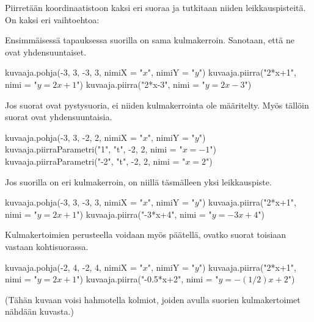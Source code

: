 
Piirretään koordinaatistoon kaksi eri suoraa ja tutkitaan niiden leikkauspisteitä.
On kaksi eri vaihtoehtoa:

Ensimmäisessä tapauksessa suorilla on sama kulmakerroin. Sanotaan, että ne ovat yhdensuuntaiset.

\begin{kuva}
    kuvaaja.pohja(-3, 3, -3, 3, nimiX = "$x$", nimiY = "$y$")
    kuvaaja.piirra("2*x+1", nimi = "$y=2x+1$")
    kuvaaja.piirra("2*x-3", nimi = "$y=2x-3$")
\end{kuva}

Jos suorat ovat pystysuoria, ei niiden kulmakerrointa ole määritelty. Myös tällöin suorat ovat yhdensuuntaisia.

\begin{kuva}
    kuvaaja.pohja(-3, 3, -2, 2, nimiX = "$x$", nimiY = "$y$")
    kuvaaja.piirraParametri("1", "t", -2, 2, nimi = "$x=-1$")
    kuvaaja.piirraParametri("-2", "t", -2, 2, nimi = "$x=2$")
\end{kuva}


Jos suorilla on eri kulmakerroin, on niillä täsmälleen yksi leikkauspiste. 

\begin{kuva}
    kuvaaja.pohja(-3, 3, -3, 3, nimiX = "$x$", nimiY = "$y$")
    kuvaaja.piirra("2*x+1", nimi = "$y=2x+1$")
    kuvaaja.piirra("-3*x+4", nimi = "$y=-3x+4$")
\end{kuva}

Kulmakertoimien perusteella voidaan myös päätellä, ovatko suorat toisiaan vastaan kohtisuorassa.

\begin{kuva}
    kuvaaja.pohja(-2, 4, -2, 4, nimiX = "$x$", nimiY = "$y$")
    kuvaaja.piirra("2*x+1", nimi = "$y=2x+1$")
    kuvaaja.piirra("-0.5*x+2", nimi = "$y=-(1/2)x+2$")
\end{kuva}

(Tähän kuvaan voisi hahmotella kolmiot, joiden avulla suorien kulmakertoimet nähdään kuvasta.)


